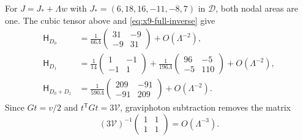 For $J=J_*+\Lambda w$ with
$J_*=(6,18,16,-11,-8,7)$ in $\mathcal D$, both nodal areas
are one. The cubic tensor above and \eqref{eq:x9-full-inverse}
give
\begin{equation}
\begin{aligned}
 \mathsf H_{D_0}
 &=\frac1{66\Lambda}\begin{pmatrix}31&-9\\-9&31\end{pmatrix}
   +O(\Lambda^{-2}),\\
 \mathsf H_{D_1}
 &=\frac1{14}\begin{pmatrix}1&-1\\-1&1\end{pmatrix}
   +\frac1{196\Lambda}\begin{pmatrix}96&-5\\-5&110\end{pmatrix}
   +O(\Lambda^{-2}),\\
 \mathsf H_{D_0+D_1}
 &=\frac1{590\Lambda}\begin{pmatrix}209&-91\\-91&209\end{pmatrix}
   +O(\Lambda^{-2}).
\end{aligned}
\label{eq:x9-current-asymptotics}
\end{equation}
Since $Gt=v/2$ and $t^{\mathsf T}Gt=3\mathcal V$, graviphoton
subtraction removes the matrix
\[
 (3\mathcal V)^{-1}\begin{pmatrix}1&1\\1&1\end{pmatrix}
 =O(\Lambda^{-3}).
\]
